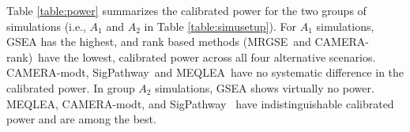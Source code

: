 \documentclass[a4,center,fleqn]{NAR}
\newcommand{\OurMethod}{MEQLEA}
\newcommand{\aaCase}{a}
\newcommand{\CMR}{CAMERA-rank}
\newcommand{\CMT}{CAMERA-modt}
\newcommand{\gent}{SigPathway}
\newcommand{\genr}{MRGSE}
\begin{document}
	Table \ref{table:power} summarizes the calibrated power for the two groups of simulations (i.e.,
	$A_1$ and $A_2$ in Table \ref{table:simusetup}).%
	For $A_1$ simulations, GSEA has the highest, and rank based methods (\genr~and \CMR)~have the
	lowest, calibrated power across all four alternative scenarios. \CMT, \gent~and \OurMethod~have no
	systematic difference in the calibrated power. %
	In group $A_2$ simulations, GSEA shows virtually no power. \OurMethod, \CMT, and \gent~ have
	indistinguishable calibrated power and are among the best.
	
\end{document}
